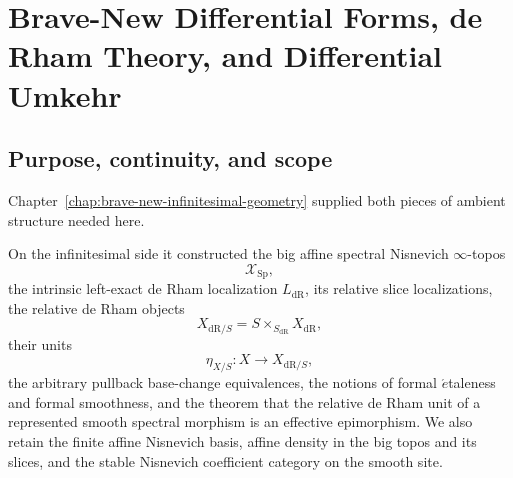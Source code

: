 
\providecommand{\dR}{\mathrm{dR}}
\providecommand{\op}{\mathrm{op}}
\providecommand{\Map}{\operatorname{Map}}
\providecommand{\map}{\operatorname{map}}
\providecommand{\Hom}{\operatorname{Hom}}
\providecommand{\Spec}{\operatorname{Spec}}
\providecommand{\Sp}{\mathrm{Sp}}
\providecommand{\Tot}{\operatorname*{Tot}}
\providecommand{\CGrp}{\operatorname{CGrp}}
\providecommand{\CAlg}{\operatorname{CAlg}}
\providecommand{\Fun}{\operatorname{Fun}}
\providecommand{\fib}{\operatorname{fib}}
\providecommand{\hofib}{\operatorname{hofib}}
\providecommand{\cofib}{\operatorname{cofib}}
\providecommand{\colim}{\operatorname*{colim}}
\providecommand{\limop}{\operatorname*{lim}}
\providecommand{\Sym}{\operatorname{Sym}}
\providecommand{\gr}{\operatorname{gr}}
\providecommand{\id}{\operatorname{id}}
\providecommand{\DR}{\operatorname{DR}}
\providecommand{\Sm}{\operatorname{Sm}}
\providecommand{\fp}{\mathrm{fp}}
\providecommand{\Nis}{\mathrm{Nis}}
\providecommand{\cl}{\mathrm{cl}}
\providecommand{\add}{\mathrm{add}}
\providecommand{\Am}{\operatorname{Am}}
\providecommand{\sk}{\operatorname{sk}}
\providecommand{\OmegaInf}{\Omega_{\mathrm{inf}}}

\providecommand{\SH}{\mathrm{SH}}
\providecommand{\Disc}{\operatorname{Disc}}
\providecommand{\RealDiff}{\operatorname{Real}^{0}}
\providecommand{\ObsBNV}{\operatorname{Obs}_{\mathrm{BNV}}}
\providecommand{\Trdiff}{\operatorname{tr}^{\partial}}
\providecommand{\IntBNV}{\int^{\mathrm{BNV}}}
\providecommand{\Transdiff}{\operatorname{Trans}^{\partial}}
\providecommand{\Shv}{\mathrm{Shv}}



\chapter{Brave-New Differential Forms, de Rham Theory, and Differential Umkehr}
\label{chap:brave-new-monadic-de-rham}
\label{ch:brave-new-modal-de-rham}
\label{ch:brave-new-differential-forms}
\label{chap:brave-new-de-rham-umkehr}

\section{Purpose, continuity, and scope}
\label{sec:monadic-de-rham-purpose}

Chapter~\ref{chap:brave-new-infinitesimal-geometry} supplied both pieces of
ambient structure needed here.

On the infinitesimal side it constructed the big affine spectral Nisnevich
\(\infty\)-topos
\[
    \mathcal X_{\Sp},
\]
the intrinsic left-exact de Rham localization \(L_{\dR}\), its relative slice
localizations, the relative de Rham objects
\[
    X_{\dR/S}=S\times_{S_{\dR}}X_{\dR},
\]
their units
\[
    \eta_{X/S}:X\longrightarrow X_{\dR/S},
\]
the arbitrary pullback base-change equivalences, the notions of formal
\(\acute{e}\)taleness and formal smoothness, and the theorem that the relative
de Rham unit of a represented smooth spectral morphism is an effective
epimorphism.  We also retain the finite affine Nisnevich basis, affine density
in the big topos and its slices, and the stable Nisnevich coefficient category
on the smooth site.

